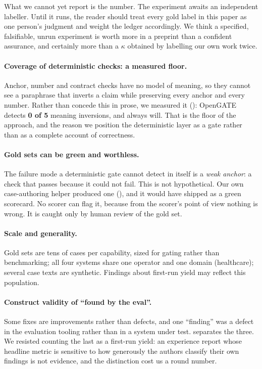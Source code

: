 \documentclass[11pt,a4paper]{article}
\begin{document}
What we cannot yet report is the number. The experiment awaits an independent labeller. Until it runs,
the reader should treat every gold label in this paper as one person's judgment and weight the ledger
accordingly. We think a specified, falsifiable, unrun experiment is worth more in a preprint than a
confident assurance, and certainly more than a $\kappa$ obtained by labelling our own work twice.

\paragraph{Coverage of deterministic checks: a measured floor.}
Anchor, number and contract checks have no model of meaning, so they cannot see a paraphrase that
inverts a claim while preserving every anchor and every number. Rather than concede this in prose, we
measured it (): OpenGATE detects \textbf{0 of 5} meaning inversions, and always will.
That is the floor of the approach, and the reason we position the deterministic layer as a gate rather
than as a complete account of correctness.

\paragraph{Gold sets can be green and worthless.}
The failure mode a deterministic gate cannot detect in itself is a \emph{weak anchor}: a check that
passes because it could not fail. This is not hypothetical. Our own case-authoring helper produced
one (), and it would have shipped as a green scorecard. No scorer can flag it, because
from the scorer's point of view nothing is wrong. It is caught only by human review of the gold set.

\paragraph{Scale and generality.}
Gold sets are tens of cases per capability, sized for gating rather than benchmarking; all four systems
share one operator and one domain (healthcare); several case texts are synthetic. Findings about
first-run yield may reflect this population.

\paragraph{Construct validity of ``found by the eval''.}
Some fixes are improvements rather than defects, and one ``finding'' was a defect in the evaluation
tooling rather than in a system under test.  separates the three. We resisted counting
the last as a first-run yield: an experience report whose headline metric is sensitive to how
generously the authors classify their own findings is not evidence, and the distinction cost us a round
number.
\end{document}
